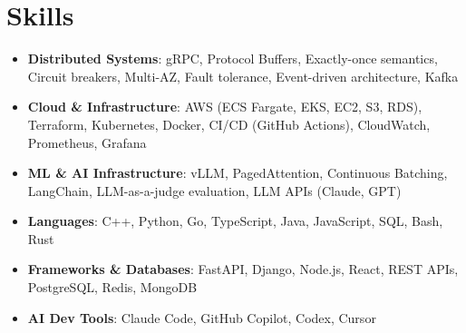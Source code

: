 \documentclass[letterpaper,11pt]{article}
\newcommand{\resumeSubHeadingListStart}{\begin{itemize}[leftmargin=0.15in, label={}]}
\newcommand{\resumeSubHeadingListEnd}{\end{itemize}}
\newcommand{\resumeSkillHeading}[2]{%
  \item\small{\textbf{#1}: #2 \vspace{-9pt}}%
}
\begin{document}
\section{Skills}
  \resumeSubHeadingListStart
    \resumeSkillHeading{Distributed Systems}{gRPC, Protocol Buffers, Exactly-once semantics, Circuit breakers, Multi-AZ, Fault tolerance, Event-driven architecture, Kafka}
    \resumeSkillHeading{Cloud \& Infrastructure}{AWS (ECS Fargate, EKS, EC2, S3, RDS), Terraform, Kubernetes, Docker, CI/CD (GitHub Actions), CloudWatch, Prometheus, Grafana}
    \resumeSkillHeading{ML \& AI Infrastructure}{vLLM, PagedAttention, Continuous Batching, LangChain, LLM-as-a-judge evaluation, LLM APIs (Claude, GPT)}
    \resumeSkillHeading{Languages}{C++, Python, Go, TypeScript, Java, JavaScript, SQL, Bash, Rust}
    \resumeSkillHeading{Frameworks \& Databases}{FastAPI, Django, Node.js, React, REST APIs, PostgreSQL, Redis, MongoDB}
    \resumeSkillHeading{AI Dev Tools}{Claude Code, GitHub Copilot, Codex, Cursor}
  \resumeSubHeadingListEnd
\end{document}
